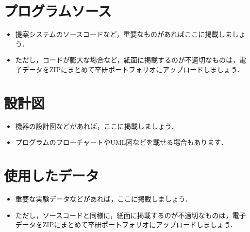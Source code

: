 \documentclass[uplatex,draft]{ipsjpapers}
\begin{document}
\section{プログラムソース}
\begin{itemize}
  \item 提案システムのソースコードなど，重要なものがあればここに掲載しましょう．
  \item ただし，コードが膨大な場合など，紙面に掲載するのが不適切なものは，電子データをZIPにまとめて卒研ポートフォリオにアップロードしましょう．
\end{itemize}
%
\section{設計図}
\begin{itemize}
  \item 機器の設計図などがあれば，ここに掲載しましょう．
  \item プログラムのフローチャートやUML図などを載せる場合もあります．
\end{itemize}
%
\section{使用したデータ}
\begin{itemize}
  \item 重要な実験データなどがあれば，ここに掲載しましょう．
  \item ただし，ソースコードと同様に，紙面に掲載するのが不適切なものは，電子データをZIPにまとめて卒研ポートフォリオにアップロードしましょう．
\end{itemize}
%
\end{document}
